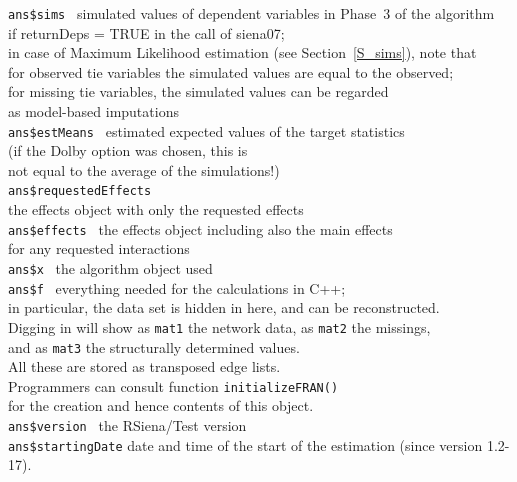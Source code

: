 \documentclass[a4paper,fleqn,11pt]{article}
\newcommand{\+}{\, + \,}
\begin{document}
\begin{tabbing}
 \texttt{ans\$sims }         \> simulated values of dependent variables
                                      in Phase~3 of the algorithm     \\
                             \>  if \textsf{returnDeps = TRUE}
                                        in the call of \textsf{siena07}; \\
                             \> in case of Maximum Likelihood estimation (see Section~\ref{S_sims}), note that \\
                             \> for observed tie variables the simulated values are
                             equal to the observed; \\
                             \> for missing tie variables, the simulated values can be regarded \\
                             \> as model-based imputations \\
 \texttt{ans\$estMeans }     \> estimated expected values of the target statistics\\
                             \> (if the Dolby option was chosen, this is \\
                             \> not equal to the average of the simulations!)\\
 \texttt{ans\$requestedEffects }  \\
                            \> the effects object with only the requested effects\\
 \texttt{ans\$effects }      \> the effects object including also the main effects\\
                                \> for any requested interactions\\
 \texttt{ans\$x }            \> the algorithm object used\\
 \texttt{ans\$f }            \> everything needed for the calculations in C++;\\
                             \> in particular, the data set is hidden in here,
                                and can be reconstructed.\\
                             \> Digging in will show as \texttt{mat1} the network data,
                                 as \texttt{mat2} the missings, \\
                             \>   and as \texttt{mat3} the structurally determined values.\\
                             \> All these are stored as transposed edge lists.\\
                             \> Programmers can consult function \texttt{initializeFRAN()}\\
                             \> for the creation and hence contents of this object.\\
 \texttt{ans\$version }      \> the \textsf{RSiena/Test} version\\
 \texttt{ans\$startingDate}  \> date and time of the start of the estimation (since version 1.2-17).\\

\end{tabbing}
\end{document}
